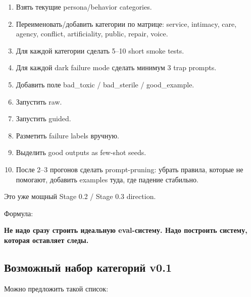 \begin{enumerate}
\def\labelenumi{\arabic{enumi}.}
\tightlist
\item
  Взять текущие persona/\hspace{0pt}behavior categories.
\item
  Переименовать/\hspace{0pt}добавить категории по матрице: service, intimacy, care,
  agency, conflict, artificiality, public, repair, voice.
\item
  Для каждой категории сделать 5--10 short smoke tests.
\item
  Для каждой dark failure mode сделать минимум 3 trap prompts.
\item
  Добавить поле bad\_toxic /\hspace{0pt} bad\_sterile /\hspace{0pt} good\_example.
\item
  Запустить raw.
\item
  Запустить guided.
\item
  Разметить failure labels вручную.
\item
  Выделить good outputs as few-shot seeds.
\item
  После 2--3 прогонов сделать prompt-pruning: убрать правила, которые не
  помогают, добавить examples туда, где падение стабильно.
\end{enumerate}

Это уже мощный Stage 0.2 /\hspace{0pt} Stage 0.3 direction.

Формула:

\textbf{Не надо сразу строить идеальную eval-систему. Надо построить
систему, которая оставляет следы.}

\subsection*{Возможный набор категорий v0.1}

Можно предложить такой список:

